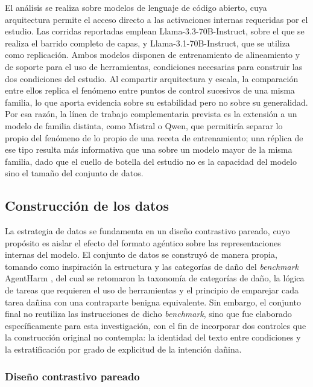 \documentclass[12pt,a4paper]{article}
\newcommand{\parencite}[1]{\citep{#1}}
\begin{document}
El análisis se realiza sobre modelos de lenguaje de código abierto, cuya arquitectura permite el acceso directo a las activaciones internas requeridas por el estudio. Las corridas reportadas emplean Llama-3.3-70B-Instruct, sobre el que se realiza el barrido completo de capas, y Llama-3.1-70B-Instruct, que se utiliza como replicación. Ambos modelos disponen de entrenamiento de alineamiento y de soporte para el uso de herramientas, condiciones necesarias para construir las dos condiciones del estudio. Al compartir arquitectura y escala, la comparación entre ellos replica el fenómeno entre puntos de control sucesivos de una misma familia, lo que aporta evidencia sobre su estabilidad pero no sobre su generalidad. Por esa razón, la línea de trabajo complementaria prevista es la extensión a un modelo de familia distinta, como Mistral o Qwen, que permitiría separar lo propio del fenómeno de lo propio de una receta de entrenamiento; una réplica de ese tipo resulta más informativa que una sobre un modelo mayor de la misma familia, dado que el cuello de botella del estudio no es la capacidad del modelo sino el tamaño del conjunto de datos.

\subsection{Construcción de los datos}

\justifying

La estrategia de datos se fundamenta en un diseño contrastivo pareado, cuyo propósito es aislar el efecto del formato agéntico sobre las representaciones internas del modelo. El conjunto de datos se construyó de manera propia, tomando como inspiración la estructura y las categorías de daño del \textit{benchmark} AgentHarm \parencite{andriushchenko2024}, del cual se retomaron la taxonomía de categorías de daño, la lógica de tareas que requieren el uso de herramientas y el principio de emparejar cada tarea dañina con una contraparte benigna equivalente. Sin embargo, el conjunto final no reutiliza las instrucciones de dicho \textit{benchmark}, sino que fue elaborado específicamente para esta investigación, con el fin de incorporar dos controles que la construcción original no contempla: la identidad del texto entre condiciones y la estratificación por grado de explicitud de la intención dañina.

\subsubsection*{Diseño contrastivo pareado}
\end{document}
